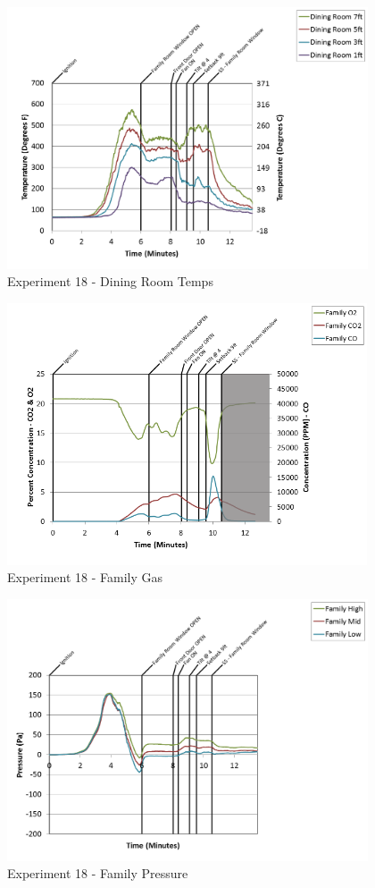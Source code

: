 \documentclass{article}
\begin{document}
\begin{appendices}
\clearpage

\begin{figure}[h!]
	\centering
	\includegraphics[height=3.05in]{0_Images/Results_Charts/Exp_18_Charts/DiningRoomTemps.png}
	\caption{Experiment 18 - Dining Room Temps}
\end{figure}


\begin{figure}[h!]
	\centering
	\includegraphics[height=3.05in]{0_Images/Results_Charts/Exp_18_Charts/FamilyGas.png}
	\caption{Experiment 18 - Family Gas}
\end{figure}

\clearpage

\begin{figure}[h!]
	\centering
	\includegraphics[height=3.05in]{0_Images/Results_Charts/Exp_18_Charts/FamilyPressure.png}
	\caption{Experiment 18 - Family Pressure}
\end{figure}



\end{appendices}
\end{document}
